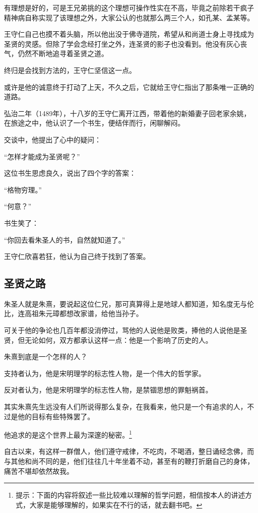 \begin{multicols}{\theparacolNo}
		有理想是好的，可是王兄弟挑的这个理想可操作性实在不高，毕竟之前除若干疯子精神病自称实现了该理想之外，大家公认的也就那么两三个人，如孔某、孟某等。

		王守仁自己也摸不着头脑，所以他出没于佛寺道院，希望从和尚道士身上寻找成为圣贤的灵感。但除了学会念经打坐之外，连圣贤的影子也没看到。他没有灰心丧气，仍然不断地追寻着圣贤之道。

		终归是会找到方法的，王守仁坚信这一点。

		或许是他的诚意终于打动了上天，不久之后，它就给王守仁指出了那条唯一正确的道路。

		弘治二年（1489年），十八岁的王守仁离开江西，带着他的新婚妻子回老家余姚，在旅途之中，他认识了一个书生，便结伴而行，闲聊解闷。

		交谈中，他提出了心中的疑问：

		“怎样才能成为圣贤呢？”

		这位书生思虑良久，说出了四个字的答案：

		“格物穷理。”

		“何意？”

		书生笑了：

		“你回去看朱圣人的书，自然就知道了。”

		王守仁欣喜若狂，他认为自己终于找到了答案。

		\subsection{圣贤之路}
		朱圣人就是朱熹，要说起这位仁兄，那可真算得上是地球人都知道，知名度无与伦比，连高祖朱元璋都想改家谱，给他当孙子。

		可关于他的争论也几百年都没消停过，骂他的人说他是败类，捧他的人说他是圣贤，但无论如何，双方都承认这样一点：他是一个影响了历史的人。

		朱熹到底是一个怎样的人？

		支持者认为，他是宋明理学的标志性人物，是一个伟大的哲学家。

		反对者认为，他是宋明理学的标志性人物，是禁锢思想的罪魁祸首。

		其实朱熹先生远没有人们所说得那么复杂，在我看来，他只是一个有追求的人，不过是他的目标有些特殊罢了。

		他追求的是这个世界上最为深邃的秘密。\footnote{提示：下面的内容将叙述一些比较难以理解的哲学问题，相信按本人的讲述方式，大家是能够理解的，如果实在不行的话，就去翻书吧。}

		自古以来，有这样一群僧人，他们遵守戒律，不吃肉，不喝酒，整日诵经念佛，而与其他和尚不同的是，他们往往几十年坐着不动，甚至有的鞭打折磨自己的身体，痛苦不堪却依然故我。


\end{multicols}
